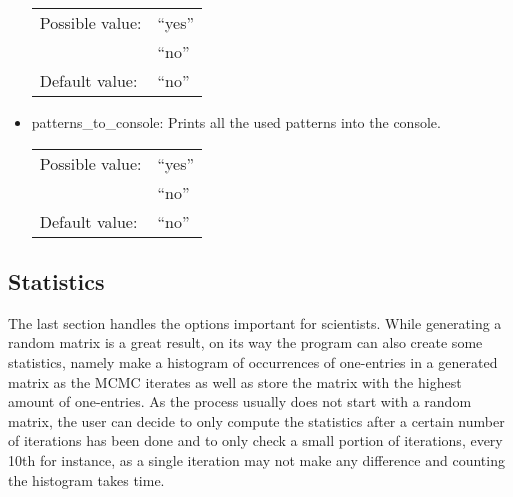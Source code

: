 \begin{itemize}
\begin{tabular}{ll}
Possible value: & ``yes'' \\
& ``no'' \\
Default value: & ``no''
\end{tabular}

\item patterns\_to\_console: Prints all the used patterns into the console.

\begin{tabular}{ll}
Possible value: & ``yes'' \\
& ``no'' \\
Default value: & ``no''
\end{tabular}
\end{itemize}
\subsection{Statistics}
The last section handles the options important for scientists. While generating a random matrix is a great result, on its way the program can also create some statistics, namely make a histogram of occurrences of one-entries in a generated matrix as the MCMC iterates as well as store the matrix with the highest amount of one-entries. As the process usually does not start with a random matrix, the user can decide to only compute the statistics after a certain number of iterations has been done and to only check a small portion of iterations, every 10th for instance, as a single iteration may not make any difference and counting the histogram takes time.
